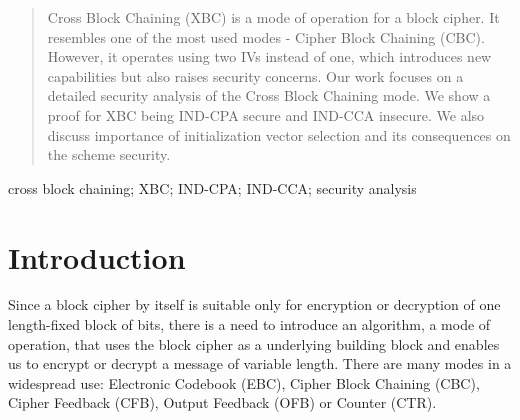 \documentclass[conference]{IEEEtran}
\begin{document}




\maketitle

\begin{abstract}
Cross Block Chaining (XBC) is a mode of operation for a block cipher. It resembles one of the most used modes - Cipher Block Chaining (CBC). However, it operates using two IVs instead of one, which introduces new capabilities but also raises security concerns. Our work focuses on a detailed security analysis of the Cross Block Chaining mode. We show a proof for XBC being IND-CPA secure and IND-CCA insecure. We also discuss importance of initialization vector selection and its consequences on the scheme security.
\end{abstract}

\begin{keywords}
cross block chaining; XBC; IND-CPA; IND-CCA; security analysis
\end{keywords}

%
\IEEEpeerreviewmaketitle

\section{Introduction}

Since a block cipher by itself is suitable only for encryption or decryption of one length-fixed block of bits, there is a need to introduce an algorithm, a mode of operation, that uses the block cipher as a underlying building block and enables us to encrypt or decrypt a message of variable length. There are many modes in a widespread use: Electronic Codebook (EBC), Cipher Block Chaining (CBC), Cipher Feedback (CFB), Output Feedback (OFB) or Counter (CTR).
\end{document}
